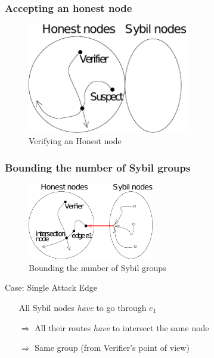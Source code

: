 \documentclass{beamer}
\begin{document}
\begin{frame}

  \frametitle{Accepting an honest node}

  \begin{figure}
    \includegraphics[width=7cm]{./pictures/verify_honest} 
    \caption{Verifying an Honest node}
  \end{figure}

\end{frame}


\begin{frame}

  \frametitle{Bounding the number of Sybil groups}

  \begin{figure}
    \includegraphics[width=5.5cm]{./pictures/bound_group} 
    \caption{Bounding the number of Sybil groups}
  \end{figure}

  \begin{block}{Case: Single Attack Edge}
    \begin{itemize}
    \item[] All Sybil nodes \emph{have} to go through $e_1$
    \item[$\Rightarrow$] All their routes \emph{have} to intersect the same node %
    \item[$\Rightarrow$] Same group (from Verifier's point of view)
    \end{itemize}
  \end{block}

\end{frame}
\end{document}
